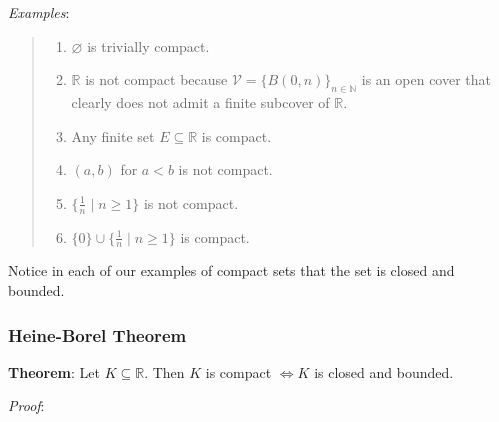\documentclass[11pt]{article}
\begin{document}
\emph{Examples}:
\begin{quote}\vspace{-0.3cm}
	\begin{enumerate}
	\item $\varnothing$ is trivially compact.
	\item $\mathbb{R}$ is not compact because $\mathcal{V} = \{B(0, n)\}_{n \in \mathbb{N}}$ is an open cover that clearly does not admit a finite subcover of $\mathbb{R}$.
	\item Any finite set $E \subseteq \mathbb{R}$ is compact.
	\item $(a,b)$ for $a < b$ is not compact.
	\item $\{\frac{1}{n} \;|\; n \geq 1\}$ is not compact.
	\item $\{0\} \cup \{\frac{1}{n} \;|\; n \geq 1\}$ is compact.
	\end{enumerate}
\end{quote}
Notice in each of our examples of compact sets that the set is closed and bounded.

\subsubsection{Heine-Borel Theorem}

\textbf{Theorem}: Let $K \subseteq \mathbb{R}$. Then $K$ is compact $\iff K$ is closed and bounded.

\emph{Proof}:
\end{document}
